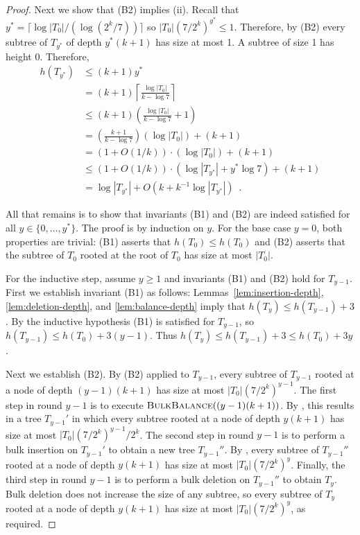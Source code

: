 \documentclass[kpfonts]{patmorin}
\let\le\leqslant
\let\ge\geqslant
\begin{document}
\begin{proof}
  Next we show that (B2) implies (ii).  Recall that $y^*=\lceil\log|T_0|/(\log(2^k/7))\rceil$ so
  $|T_{0}|(7/2^k)^{y^*} \le 1$.  Therefore, by (B2) every subtree of $T_{y^*}$ of depth $y^*(k+1)$ has size at most 1.  A subtree of size 1 has height 0.  Therefore,
  \begin{align*}
    h(T_{y^*}) & \le (k+1)y^* \\
    & = (k+1)\left\lceil \frac{\log|T_0|}{k-\log 7}\right\rceil \\
    & \le (k+1)\left(\frac{\log|T_0|}{k-\log 7 } + 1\right)\\
    & = \left(\frac{k+1}{k-\log 7}\right)\left(\log|T_0|\right) + (k+1)\\
    & = (1+O(1/k))\cdot(\log|T_0|) + (k+1) \\
    & \le (1+O(1/k))\cdot(\log|T_{y^*}| + y^*\log 7) + (k+1) \\
    & = \log|T_{y^*}| + O(k+k^{-1}\log |T_{y^*}|) \enspace .
  \end{align*}


  All that remains is to show that invariants (B1) and (B2) are indeed satisfied for all $y\in\{0,\ldots,y^*\}$.  The proof is by induction on $y$.  For the base case $y=0$, both properties are trivial: (B1) asserts that $h(T_0)\le h(T_0)$ and (B2) asserts that the subtree of $T_0$ rooted at the root of $T_0$ has size at most $|T_0|$.

  For the inductive step, assume $y\ge 1$ and invariants (B1) and (B2) hold for $T_{y-1}$.  First we establish invariant (B1) as follows:
  Lemmas~\ref{lem:insertion-depth}, \ref{lem:deletion-depth}, and \ref{lem:balance-depth} imply that $h(T_y)\le h(T_{y-1})+3$.  
  By the inductive hypothesis (B1) is satisfied for $T_{y-1}$, so $h(T_{y-1})\le h(T_0)+3(y-1)$.  Thus $h(T_y)\le h(T_{y-1}) + 3 \le h(T_0)+3y$.
  
  Next we establish (B2).  By (B2) applied to $T_{y-1}$, every subtree of $T_{y-1}$ rooted at a node of depth $(y-1)(k+1)$ has size at most $|T_{0}|(7/2^k)^{y-1}$.  The first step in round $y-1$ is to execute $\textsc{BulkBalance}((y-1)(k+1))$.  By , this results in a tree $T_{y-1}'$ in which every subtree rooted at a node of depth $y(k+1)$ has size at most $|T_{0}|(7/2^k)^{y-1}/2^k$.  The second step in round $y-1$ is to perform a bulk insertion on $T_{y-1}'$ to obtain a new tree $T_{y-1}''$.  
  By , every subtree of $T_{y-1}''$ rooted at a node of depth $y(k+1)$ has size at most $|T_{0}|(7/2^k)^{y}$.  Finally, the third step in round $y-1$ is to perform a bulk deletion on $T_{y-1}''$ to obtain $T_{y}$.  Bulk deletion does not increase the size of any subtree, so every subtree of $T_{y}$ rooted at a node of depth $y(k+1)$ has size at most $|T_{0}|(7/2^k)^{y}$, as required.
\end{proof}
\end{document}
